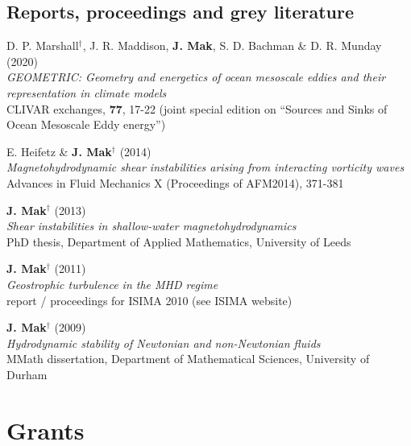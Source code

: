 \documentclass[letterpaper]{article}
\renewenvironment{itemize}{
  \begin{list}{}{
    \setlength{\leftmargin}{1.5em}
  }
}{
  \end{list}
}
\begin{document}
\subsection*{Reports, proceedings and grey literature}
\begin{itemize}

\item[E.] D. P. Marshall$^{\dagger}$, J. R. Maddison, \textbf{J. Mak}, S. D. Bachman \& D. R. Munday (2020)\\
\textit{GEOMETRIC: Geometry and energetics of ocean mesoscale eddies and their representation in climate models}\\
CLIVAR exchanges, \textbf{77}, 17-22 (joint special edition on ``Sources and Sinks
of Ocean Mesoscale Eddy energy'')

\item[D.] E. Heifetz \& \textbf{J. Mak}$^{\dagger}$ (2014)\\
\textit{Magnetohydrodynamic shear instabilities arising from interacting
vorticity waves}\\
Advances in Fluid Mechanics X (Proceedings of AFM2014), 371-381

\item[C.] \textbf{J. Mak}$^{\dagger}$ (2013)\\
\textit{Shear instabilities in shallow-water magnetohydrodynamics}\\
PhD thesis, Department of Applied Mathematics, University of Leeds

\item[B.] \textbf{J. Mak}$^{\dagger}$ (2011)\\
\textit{Geostrophic turbulence in the MHD regime}\\
report / proceedings for ISIMA 2010 (see ISIMA website)

\item[A.] \textbf{J. Mak}$^{\dagger}$ (2009)\\
\textit{Hydrodynamic stability of Newtonian and non-Newtonian fluids}\\
MMath dissertation, Department of Mathematical Sciences, University of Durham
\end{itemize}

\section*{Grants}
\end{document}
